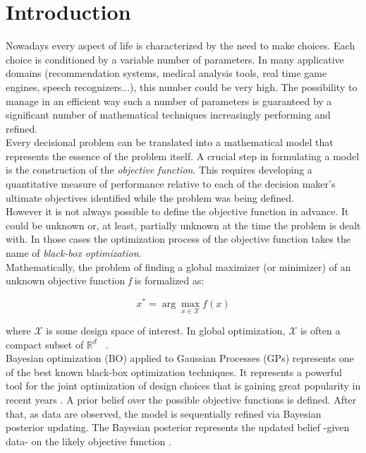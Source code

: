 \chapter{Introduction}

Nowadays every aspect of life is characterized by the need to make choices. Each choice is conditioned by a variable number of parameters. In many applicative domains (recommendation systems, medical analysis tools, real time game engines, speech recognizers...), this number could be very high.  The possibility to manage in an efficient way such a number of parameters is guaranteed by a significant number of mathematical techniques increasingly performing and refined.  \\

Every decisional problem can be translated into a mathematical model that represents the essence of the problem itself. A crucial step in formulating a model is the construction of the \textit{objective function}. This requires developing a quantitative measure of performance relative to each of the decision maker’s ultimate objectives identified while the problem was being defined.~\cite{HillLieb01} \\

However it is not always possible to define the objective function in advance. It could be unknown or, at least, partially unknown at the time the problem is dealt with. In those cases the optimization process of the objective function takes the name of \textit{black-box optimization}. \\

Mathematically, the problem of finding a global maximizer (or minimizer) of an unknown objective function \textit{f} is formalized as:

\begin{equation}
x^* = \arg \max_{x \in \mathcal{X}} f(x)
\end{equation}

where $\mathcal{X}$ is some design space of interest. In global optimization, $\mathcal{X}$ is often a compact subset of $\mathbb{R}^d$ ~\cite{DBLP:journals/pieee/ShahriariSWAF16}. \\

Bayesian optimization (BO) applied to Gaussian Processes (GPs) represents one of the best known black-box optimization techniques. It represents a powerful tool for the joint optimization of design choices that is gaining great popularity in recent years \cite{Adams2008GaussianPP}. A prior belief over the possible objective functions is defined. After that, as data are observed, the model is sequentially refined via Bayesian posterior updating. The Bayesian posterior represents the updated belief -given data- on the likely objective function \cite{DBLP:journals/pieee/ShahriariSWAF16}. \\


